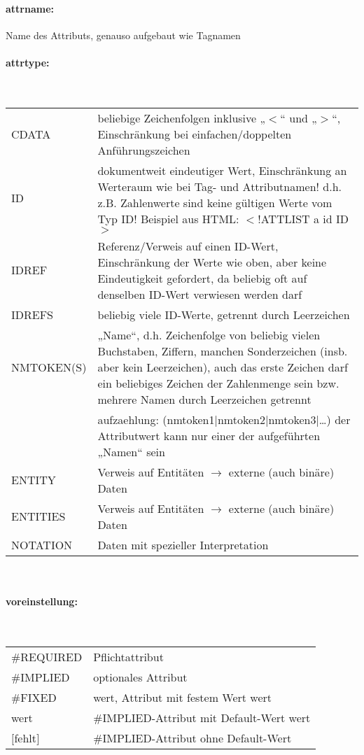 \paragraph{attrname:}Name des Attributs, genauso aufgebaut wie Tagnamen
\paragraph{attrtype:}\hspace*{0,5mm}\\
\begin{tabularx}{\textwidth}{lX}
CDATA & beliebige Zeichenfolgen inklusive „$<$“ und „$>$“, Einschränkung bei einfachen/doppelten Anführungszeichen\\
ID & dokumentweit eindeutiger Wert, Einschränkung an Werteraum wie bei Tag- und Attributnamen! d.h. z.B. Zahlenwerte sind keine gültigen Werte vom Typ ID!	Beispiel aus HTML: $<$!ATTLIST a id ID$>$\\
IDREF & Referenz/Verweis auf einen ID-Wert, Einschränkung der Werte wie oben, aber keine 	Eindeutigkeit gefordert, da beliebig oft auf denselben ID-Wert verwiesen werden darf\\
IDREFS & beliebig viele ID-Werte, getrennt durch Leerzeichen\\
NMTOKEN(S) & „Name“, d.h. Zeichenfolge von beliebig vielen Buchstaben, Ziffern, manchen Sonderzeichen (insb. aber kein Leerzeichen), auch das erste Zeichen darf ein beliebiges Zeichen der Zahlenmenge sein bzw. mehrere Namen durch Leerzeichen getrennt\\
 & aufzaehlung: (nmtoken1|nmtoken2|nmtoken3|…) der Attributwert kann nur einer der aufgeführten „Namen“ sein\\
ENTITY & Verweis auf Entitäten $\rightarrow$ externe (auch binäre) Daten\\
ENTITIES & Verweis auf Entitäten $\rightarrow$ externe (auch binäre) Daten\\
NOTATION & Daten mit spezieller Interpretation\\
\end{tabularx}\\
\paragraph{voreinstellung:}\hspace*{0,5mm}\\
\begin{tabular}{ll}
\#REQUIRED & Pflichtattribut\\
\#IMPLIED & optionales Attribut\\
\#FIXED & wert, Attribut mit festem Wert wert\\
wert & \#IMPLIED-Attribut mit Default-Wert wert\\
$[$fehlt$]$ & \#IMPLIED-Attribut ohne Default-Wert\\
\end{tabular}

